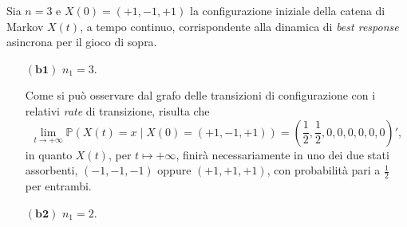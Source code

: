 \documentclass[11pt,largemargins]{homework}
\begin{document}
\begin{alphaparts}
  
  
  \newpage
  \questionpart
  Sia $n=3$ e $X\left(0\right)=\left(+1,-1,+1\right)$ la configurazione iniziale della catena di Markov $X\left(t\right)$, a tempo continuo, corrispondente alla dinamica di \emph{best response} asincrona per il gioco di sopra. \\
  \begin{itemize}
  
 \item[$\left(\textbf{b1}\right)$] $n_{1}=3$. 
 
 
  
  Come si può osservare dal grafo delle transizioni di configurazione con i relativi \emph{rate} di transizione, risulta che
  \begin{equation*}
  \lim\limits_{t \rightarrow +\infty}\mathbb{P}\left(X\left(t\right)=x\mid X\left(0\right)=\left(+1,-1,+1\right)\right)=\left(\frac{1}{2},\frac{1}{2},0,0,0,0,0,0\right)',
\end{equation*}
in quanto $X\left(t\right)$, per $t\mapsto +\infty$, finirà necessariamente in uno dei due stati assorbenti, $\left(-1,-1,-1\right)$ oppure $\left(+1,+1,+1\right)$, con probabilità pari a $\frac{1}{2}$ per entrambi.

\newpage
   \item[$\left(\textbf{b2}\right)$] $n_{1}=2$. 
 
 
  

\end{itemize}
\end{alphaparts}
\end{document}
